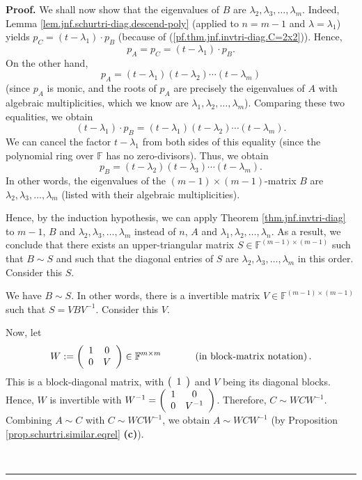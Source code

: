 \documentclass[numbers=enddot,12pt,final,onecolumn,notitlepage]{scrartcl}%
\numberwithin{exer}{subsection}
\theoremstyle{definition}
\newenvironment{proof}[1][Proof]{\noindent\textbf{#1.} }{\ \rule{0.5em}{0.5em}}
\begin{document}
\begin{proof}
We shall now show that the eigenvalues of $B$ are $\lambda_{2},\lambda
_{3},\ldots,\lambda_{m}$. Indeed, Lemma
\ref{lem.jnf.schurtri-diag.descend-poly} (applied to $n=m-1$ and
$\lambda=\lambda_{1}$) yields $p_{C}=\left(  t-\lambda_{1}\right)  \cdot
p_{B}$ (because of (\ref{pf.thm.jnf.invtri-diag.C=2x2})). Hence,%
\[
p_{A}=p_{C}=\left(  t-\lambda_{1}\right)  \cdot p_{B}.
\]
On the other hand,%
\[
p_{A}=\left(  t-\lambda_{1}\right)  \left(  t-\lambda_{2}\right)
\cdots\left(  t-\lambda_{m}\right)
\]
(since $p_{A}$ is monic, and the roots of $p_{A}$ are precisely the
eigenvalues of $A$ with algebraic multiplicities, which we know are
$\lambda_{1},\lambda_{2},\ldots,\lambda_{m}$). Comparing these two equalities,
we obtain%
\[
\left(  t-\lambda_{1}\right)  \cdot p_{B}=\left(  t-\lambda_{1}\right)
\left(  t-\lambda_{2}\right)  \cdots\left(  t-\lambda_{m}\right)  .
\]
We can cancel the factor $t-\lambda_{1}$ from both sides of this equality
(since the polynomial ring over $\mathbb{F}$ has no zero-divisors). Thus, we
obtain%
\[
p_{B}=\left(  t-\lambda_{2}\right)  \left(  t-\lambda_{3}\right)
\cdots\left(  t-\lambda_{m}\right)  .
\]
In other words, the eigenvalues of the $\left(  m-1\right)  \times\left(
m-1\right)  $-matrix $B$ are $\lambda_{2},\lambda_{3},\ldots,\lambda_{m}$
(listed with their algebraic multiplicities).

Hence, by the induction hypothesis, we can apply Theorem
\ref{thm.jnf.invtri-diag} to $m-1$, $B$ and $\lambda_{2},\lambda_{3}%
,\ldots,\lambda_{m}$ instead of $n$, $A$ and $\lambda_{1},\lambda_{2}%
,\ldots,\lambda_{n}$. As a result, we conclude that there exists an
upper-triangular matrix $S\in\mathbb{F}^{\left(  m-1\right)  \times\left(
m-1\right)  }$ such that $B\sim S$ and such that the diagonal entries of $S$
are $\lambda_{2},\lambda_{3},\ldots,\lambda_{m}$ in this order. Consider this
$S$.

We have $B\sim S$. In other words, there is a invertible matrix $V\in
\mathbb{F}^{\left(  m-1\right)  \times\left(  m-1\right)  }$ such that
$S=VBV^{-1}$. Consider this $V$.

Now, let%
\[
W:=\left(
\begin{array}
[c]{cc}%
1 & 0\\
0 & V
\end{array}
\right)  \in\mathbb{F}^{m\times m}\ \ \ \ \ \ \ \ \ \ \left(  \text{in
block-matrix notation}\right)  .
\]
This is a block-diagonal matrix, with $\left(
\begin{array}
[c]{c}%
1
\end{array}
\right)  $ and $V$ being its diagonal blocks. Hence, $W$ is invertible with
$W^{-1}=\left(
\begin{array}
[c]{cc}%
1 & 0\\
0 & V^{-1}%
\end{array}
\right)  $. Therefore, $C\sim WCW^{-1}$. Combining $A\sim C$ with $C\sim
WCW^{-1}$, we obtain $A\sim WCW^{-1}$ (by Proposition
\ref{prop.schurtri.similar.eqrel} \textbf{(c)}).


\end{proof}
\end{document}
